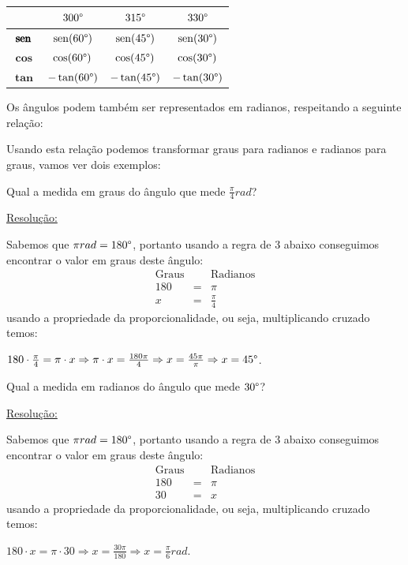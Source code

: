  \begin{table}[h]
 \centering
 \begin{tabular}{|c|c|c|c|} \hline
 \rowcolor{cinza}
               & $300\degree$ & $315\degree$ & $330\degree$ \\\hline
  $\pmb{\operatorname{sen}}$ & $\operatorname{sen}(60\degree)$ & $\operatorname{sen}(45\degree)$ & $\operatorname{sen}(30\degree)$ \\\hline
  $\pmb{\cos}$ & $\cos(60\degree)$ & $\cos(45\degree)$ & $\cos(30\degree)$  \\\hline
  $\pmb{\tan}$ & $-\tan(60\degree)$ & $-\tan(45\degree)$ & $-\tan(30\degree)$  \\\hline
 \end{tabular}
\end{table}


  Os ângulos podem também ser representados em radianos, respeitando a seguinte relação:


  Usando esta relação podemos transformar graus para radianos e radianos para graus, vamos ver dois exemplos:

  \begin{exem}
   Qual a medida em graus do ângulo que mede $\frac{\pi}{4} rad$?

   \underline{Resolução:}

   Sabemos que $\pi rad= 180\degree$, portanto usando a regra de 3 abaixo conseguimos encontrar o valor em graus deste ângulo:
   \begin{eqnarray*}
  \text{Graus} & & \text{Radianos} \\
   180 & = & \pi\\
  x & = & \frac{\pi}{4}
 \end{eqnarray*}
 usando a propriedade da proporcionalidade, ou seja, multiplicando cruzado temos:

 $180 \cdot \frac{\pi}{4}= \pi \cdot x \Rightarrow \pi \cdot x= \frac{180 \pi}{4} \Rightarrow x= \frac{45 \pi}{\pi} \Rightarrow x= 45\degree$.

 \fim
  \end{exem}

  \begin{exem}
   Qual a medida em radianos do ângulo que mede $30\degree$?

   \underline{Resolução:}

   Sabemos que $\pi rad= 180\degree$, portanto usando a regra de 3 abaixo conseguimos encontrar o valor em graus deste ângulo:
   \begin{eqnarray*}
  \text{Graus} & & \text{Radianos} \\
   180 & = & \pi\\
  30 & = & x
 \end{eqnarray*}
 usando a propriedade da proporcionalidade, ou seja, multiplicando cruzado temos:

 $180 \cdot x= \pi \cdot 30 \Rightarrow x= \frac{30 \pi}{180} \Rightarrow x= \frac{\pi}{6} rad$.

 \fim
  \end{exem}

